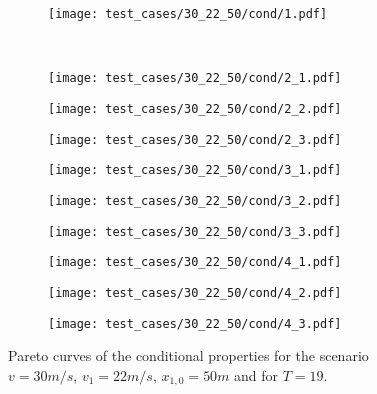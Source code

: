 \begin{figure}[H]
\vspace{3em}
\centering
\begin{subfigure}{0.32\textwidth}
  \centering
  \texttt{[image: test\_cases/30\_22\_50/cond/1.pdf]}
\end{subfigure}\\
\begin{subfigure}{0.32\textwidth}
  \centering
  \texttt{[image: test\_cases/30\_22\_50/cond/2\_1.pdf]}
\end{subfigure} 
\begin{subfigure}{0.32\textwidth}
  \centering
  \texttt{[image: test\_cases/30\_22\_50/cond/2\_2.pdf]}
\end{subfigure}
\begin{subfigure}{0.32\textwidth}
  \centering
  \texttt{[image: test\_cases/30\_22\_50/cond/2\_3.pdf]}
\end{subfigure}
\begin{subfigure}{0.32\textwidth}
  \centering
  \texttt{[image: test\_cases/30\_22\_50/cond/3\_1.pdf]}
\end{subfigure}
\begin{subfigure}{0.32\textwidth}
  \centering
  \texttt{[image: test\_cases/30\_22\_50/cond/3\_2.pdf]}
\end{subfigure}
\begin{subfigure}{0.32\textwidth}
  \centering
  \texttt{[image: test\_cases/30\_22\_50/cond/3\_3.pdf]}
\end{subfigure}
\begin{subfigure}{0.32\textwidth}
  \centering
  \texttt{[image: test\_cases/30\_22\_50/cond/4\_1.pdf]}
\end{subfigure} 
\begin{subfigure}{0.32\textwidth}
  \centering
  \texttt{[image: test\_cases/30\_22\_50/cond/4\_2.pdf]}
\end{subfigure}
\begin{subfigure}{0.32\textwidth}
  \centering
  \texttt{[image: test\_cases/30\_22\_50/cond/4\_3.pdf]}
\end{subfigure}
\caption{Pareto curves of the conditional properties for the scenario $v = 30m/s$, $v_1 = 22m/s$, $x_{1,0} = 50m$ and for $T = 19$.}
\label{fig:test_case_2_cond}
\end{figure}

